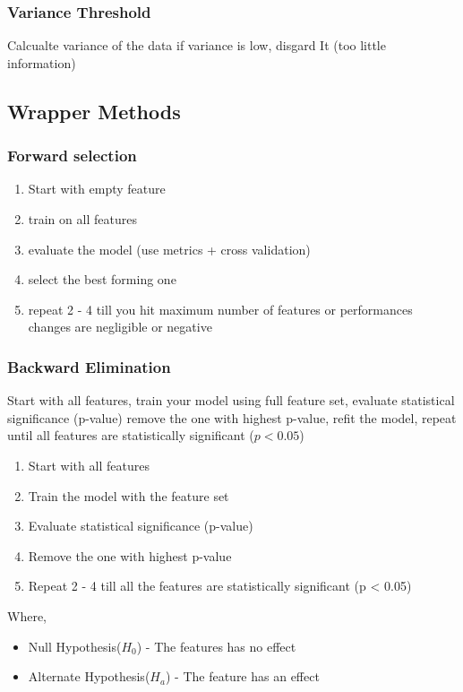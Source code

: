 \documentclass[12pt]{extarticle}
\begin{document}
\subsubsection{Variance Threshold}
Calcualte variance of the data if variance is low, disgard It
(too little information)

\subsection{Wrapper Methods}
\subsubsection{Forward selection}
\begin{enumerate}
    \item Start with empty feature
    \item train on all features 
    \item evaluate the model (use metrics + cross validation)
    \item select the best forming one 
    \item repeat 2 - 4 till you hit maximum number of features or performances changes are 
    negligible or negative
\end{enumerate}

\subsubsection{Backward Elimination}
Start with all features, train your model using full feature set, evaluate statistical 
significance (p-value) remove the one with highest p-value, refit the model, repeat until
all features are statistically significant ($p < 0.05$)
\begin{enumerate}
    \item Start with all features 
    \item Train the model with the feature set
    \item Evaluate statistical significance (p-value)
    \item Remove the one with highest p-value
    \item Repeat 2 - 4 till all the features are statistically significant (p < 0.05) 
\end{enumerate}
Where, \\
\begin{itemize}
    \item Null Hypothesis($H_0$) - The features has no effect 
    \item Alternate Hypothesis($H_a$) - The feature has an effect
\end{itemize}
\end{document}
